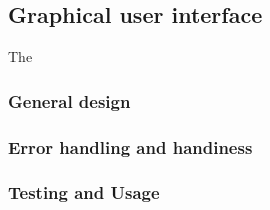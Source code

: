 \subsection{Graphical user interface} %
\label{sub:graphical_user_interface}

The 


\subsubsection{General design} %
\label{ssub:general_design}


\subsubsection{Error handling and handiness} %
\label{ssub:handling_of_the_gui}




\subsubsection{Testing and Usage} %
\label{ssub:testing_and_usage}








